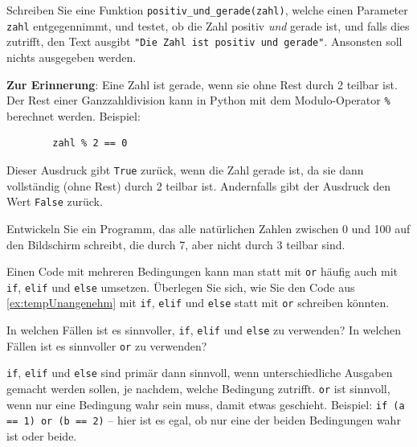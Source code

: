 \begin{myexercise}\label{ex:posUndGerade}
	Schreiben Sie eine Funktion \lstinline|positiv_und_gerade(zahl)|, welche einen Parameter \lstinline|zahl| entgegennimmt, und testet, ob die Zahl positiv \textit{und} gerade ist, und falls dies zutrifft, den Text ausgibt \lstinline|"Die Zahl ist positiv und gerade"|. Ansonsten soll nichts ausgegeben werden.

	\textbf{Zur Erinnerung}: Eine Zahl ist gerade, wenn sie ohne Rest durch 2 teilbar ist. Der Rest einer Ganzzahldivision kann in Python mit dem Modulo-Operator \lstinline|%| berechnet werden. Beispiel:
	\begin{lstlisting}
		zahl % 2 == 0
	\end{lstlisting}
	Dieser Ausdruck gibt \lstinline|True| zurück, wenn die Zahl gerade ist, da sie dann vollständig (ohne Rest) durch 2 teilbar ist. Andernfalls gibt der Ausdruck den Wert \lstinline|False| zurück.


	\begin{myanswer}
		
	\end{myanswer}
\end{myexercise}

\begin{myexercise}
	Entwickeln Sie ein Programm, das alle natürlichen Zahlen zwischen 0 und 100 auf den Bildschirm schreibt, die durch 7, aber nicht durch 3 teilbar sind.
	\begin{myanswer}
		
	\end{myanswer}
\end{myexercise}

\begin{mychallenge}
	Einen Code mit mehreren Bedingungen kann man statt mit \lstinline|or| häufig auch mit \lstinline|if|, \lstinline|elif| und \lstinline|else| umsetzen. Überlegen Sie sich, wie Sie den Code aus \cref{ex:tempUnangenehm} mit \lstinline|if|, \lstinline|elif| und \lstinline|else| statt mit \lstinline|or| schreiben könnten.

	In welchen Fällen ist es sinnvoller, \lstinline|if|, \lstinline|elif| und \lstinline|else| zu verwenden? In welchen Fällen ist es sinnvoller \lstinline|or| zu verwenden?
	\begin{myanswer}
		\lstinline|if|, \lstinline|elif| und \lstinline|else| sind primär dann sinnvoll, wenn unterschiedliche Ausgaben gemacht werden sollen, je nachdem, welche Bedingung zutrifft. \lstinline|or| ist sinnvoll, wenn nur eine Bedingung wahr sein muss, damit etwas geschieht. Beispiel: \lstinline|if (a == 1) or (b == 2)| -- hier ist es egal, ob nur eine der beiden Bedingungen wahr ist oder beide.
	\end{myanswer}
\end{mychallenge}

